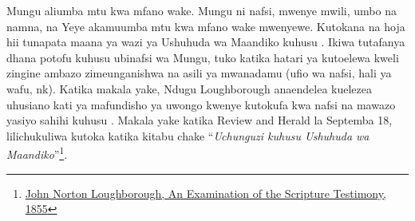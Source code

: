 Mungu aliumba mtu kwa mfano wake. Mungu ni nafsi, mwenye mwili, umbo na namna, na Yeye akamuumba mtu kwa mfano wake mwenyewe. Kutokana na hoja hii tunapata maana ya wazi ya Ushuhuda wa Maandiko kuhusu . Ikiwa tutafanya dhana potofu kuhusu ubinafsi wa Mungu, tuko katika hatari ya kutoelewa kweli zingine ambazo zimeunganishwa na asili ya mwanadamu (ufio wa nafsi, hali ya wafu, nk). Katika makala yake, Ndugu Loughborough anaendelea kuelezea uhusiano kati ya mafundisho ya uwongo kwenye kutokufa kwa nafsi na mawazo yasiyo sahihi kuhusu . Makala yake katika Review and Herald la Septemba 18, lilichukuliwa kutoka katika kitabu chake “\textit{Uchunguzi kuhusu Ushuhuda wa Maandiko}”\footnote{\href{https://egwwritings.org/?ref=en_MPC.2&para=961.2}{John Norton Loughborough, An Examination of the Scripture Testimony, 1855}}.






